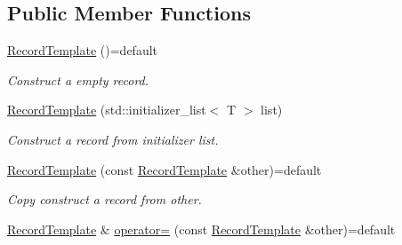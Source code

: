 \subsection*{Public Member Functions}
\begin{DoxyCompactItemize}
\item 
\hyperlink{class_mdt_1_1_plain_text_1_1_record_template_a41d66a5fcd2b428f6069df48ae62f1b9}{Record\+Template} ()=default\hypertarget{class_mdt_1_1_plain_text_1_1_record_template_a41d66a5fcd2b428f6069df48ae62f1b9}{}\label{class_mdt_1_1_plain_text_1_1_record_template_a41d66a5fcd2b428f6069df48ae62f1b9}

\begin{DoxyCompactList}\small\item\em Construct a empty record. \end{DoxyCompactList}\item 
\hyperlink{class_mdt_1_1_plain_text_1_1_record_template_a26a12294fd3e952dc03c25deb52ad604}{Record\+Template} (std\+::initializer\+\_\+list$<$ T $>$ list)\hypertarget{class_mdt_1_1_plain_text_1_1_record_template_a26a12294fd3e952dc03c25deb52ad604}{}\label{class_mdt_1_1_plain_text_1_1_record_template_a26a12294fd3e952dc03c25deb52ad604}

\begin{DoxyCompactList}\small\item\em Construct a record from initializer list. \end{DoxyCompactList}\item 
\hyperlink{class_mdt_1_1_plain_text_1_1_record_template_a6a8b445abddb7a6d3788f6ac46af727b}{Record\+Template} (const \hyperlink{class_mdt_1_1_plain_text_1_1_record_template}{Record\+Template} \&other)=default\hypertarget{class_mdt_1_1_plain_text_1_1_record_template_a6a8b445abddb7a6d3788f6ac46af727b}{}\label{class_mdt_1_1_plain_text_1_1_record_template_a6a8b445abddb7a6d3788f6ac46af727b}

\begin{DoxyCompactList}\small\item\em Copy construct a record from {\itshape other}. \end{DoxyCompactList}\item 
\hyperlink{class_mdt_1_1_plain_text_1_1_record_template}{Record\+Template} \& \hyperlink{class_mdt_1_1_plain_text_1_1_record_template_a0d02bf23beda040d619bb97eb77e2662}{operator=} (const \hyperlink{class_mdt_1_1_plain_text_1_1_record_template}{Record\+Template} \&other)=default\hypertarget{class_mdt_1_1_plain_text_1_1_record_template_a0d02bf23beda040d619bb97eb77e2662}{}\label{class_mdt_1_1_plain_text_1_1_record_template_a0d02bf23beda040d619bb97eb77e2662}


\end{DoxyCompactItemize}
